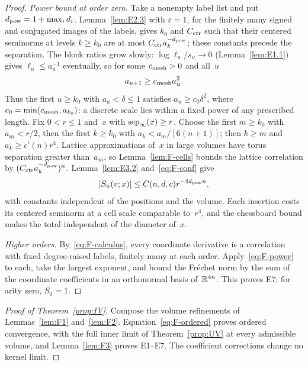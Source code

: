 \begin{proof}
\emph{Power bound at order zero.} Take a nonempty label list and put $d_{\rm pow}=1+\max_id_i$. Lemma~\ref{lem:E2.3} with $\varepsilon=1$, for the finitely many signed and conjugated images of the labels, gives $k_0$ and $C_{\rm ctr}$ such that their centered seminorms at levels $k\ge k_0$ are at most $C_{\rm ctr}a_k^{-d_{\rm pow}}$; these constants precede the separation. The block ratios grow slowly: $\log\ell_u/s_u\to0$ (Lemma~\ref{lem:E1.1}) gives $\ell_u\le a_u^{-1}$ eventually, so for some $c_{\rm mesh}>0$ and all~$u$
\begin{equation}\label{eq:F-thickness}
a_{u+1}\ge c_{\rm mesh}a_u^2.
\end{equation}
Thus the first $u\ge k_0$ with $a_u<\delta\le1$ satisfies $a_u\ge c_0\delta^2$, where $c_0=\min(c_{\rm mesh},a_{k_0})$: a discrete scale lies within a fixed power of any prescribed length. Fix $0<r\le1$ and~$x$ with $\operatorname{sep}_{\infty}(x)\ge r$. Choose the first $m\ge k_0$ with $a_m<r/2$, then the first $k\ge k_0$ with $a_k<a_m/[6(n+1)]$; then $k\ge m$ and $a_k\ge c'(n)r^4$. Lattice approximations of~$x$ in large volumes have torus separation greater than~$a_m$, so Lemma~\ref{lem:F-cells} bounds the lattice correlation by $(C_{\rm ctr}a_k^{-d_{\rm pow}})^n$. Lemma~\ref{lem:E3.2} and~\eqref{eq:F-conf} give
\begin{equation}\label{eq:F-power}
|S_n(v;x)|\le C(n,d,c)r^{-4d_{\rm pow}n},
\end{equation}
with constants independent of the positions and the volume. Each insertion costs its centered seminorm at a cell scale comparable to~$r^4$, and the chessboard bound makes the total independent of the diameter of~$x$.

\emph{Higher orders.} By~\eqref{eq:F-calculus}, every coordinate derivative is a correlation with fixed degree-raised labels, finitely many at each order. Apply~\eqref{eq:F-power} to each, take the largest exponent, and bound the Fr\'echet norm by the sum of the coordinate coefficients in an orthonormal basis of~$\mathbb{R}^{4n}$. This proves E7; for arity zero, $S_0=1$.
\end{proof}

\begin{proof}[Proof of Theorem~\ref{prop:IV}]
Compose the volume refinements of Lemmas~\ref{lem:F1} and~\ref{lem:F2}. Equation~\eqref{eq:F-ordered} proves ordered convergence, with the full inner limit of Theorem~\ref{prop:UV} at every admissible volume, and Lemma~\ref{lem:F3} proves E1--E7. The coefficient corrections change no kernel limit.
\end{proof}

